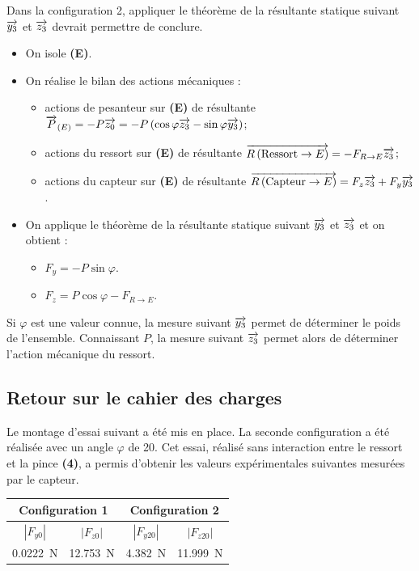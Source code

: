 \documentclass[10pt,fleqn]{article} %
\begin{document}
\begin{multicols}{2}
\begin{corrige}
\begin{methode}
Dans la configuration 2, appliquer le théorème de la résultante statique suivant $\overrightarrow{y_3}$ et $\overrightarrow{z_3}$ devrait permettre de conclure. 
\end{methode}
\begin{itemize}
\item On isole \textbf{(E)}.
\item On réalise le bilan des actions mécaniques : 
\begin{itemize}
\item actions de pesanteur sur \textbf{(E)} de résultante $\overrightarrow{P}_{(E)}=-P\overrightarrow{z_0}=-P\left(\cos\varphi  \overrightarrow{z_3}-\sin\varphi  \overrightarrow{y_3}\right)$;
\item actions du ressort sur \textbf{(E)} de résultante $\overrightarrow{R\left( {\text{Ressort}} \rightarrow {E}\right)}=-F_{R\to E} \overrightarrow{z_3}$;
\item actions du capteur sur \textbf{(E)} de résultante $\overrightarrow{R\left( {\text{Capteur}} \rightarrow {E}\right)}=F_z\overrightarrow{z_3}+F_y\overrightarrow{y_3}$.
\end{itemize}
\item On applique le théorème de la résultante statique suivant $\overrightarrow{y_3}$ et $\overrightarrow{z_3}$ et on obtient : 
\begin{itemize}
\item $F_y = -P\sin\varphi $. 
\item $F_z = P\cos\varphi  - F_{R\to E}$. 
\end{itemize}
\end{itemize}
Si $\varphi$ est une valeur connue, la mesure suivant $\overrightarrow{y_3}$ permet de déterminer le poids de l'ensemble. Connaissant $P$, la mesure suivant $\overrightarrow{z_3}$ permet alors de déterminer l'action mécanique du ressort. 
\end{corrige}
\else
\fi



\subsection*{Retour sur le cahier des charges}
\ifprof
\else


Le montage d’essai suivant a été mis en place. La seconde configuration a été réalisée avec un angle $\varphi$ de 20\degres. Cet essai, réalisé sans interaction entre le ressort et la pince \textbf{(4)}, a permis d’obtenir les valeurs expérimentales suivantes mesurées par le
capteur.
\begin{center}
\begin{tabular}{|c|c|c|c|}
\hline
\multicolumn{2}{|c|}{Configuration 1}&\multicolumn{2}{c|}{Configuration 2}\\ \hline
$|F_{y0}|$ & $|F_{z0}|$ & $|F_{y20}|$ & $|F_{z20}|$ \\ \hline
\SI{0,0222}{N} & \SI{12,753}{N} & \SI{4,382}{N} & \SI{11,999}{N} \\ \hline
\end{tabular}
\end{center}


\end{multicols}
\end{document}
